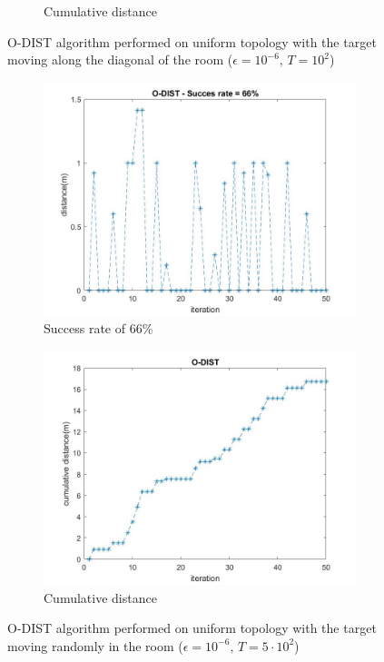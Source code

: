 \begin{figure}[H]
\begin{subfigure}{0.45\textwidth}
        \caption{Cumulative distance}
    \end{subfigure}
    \caption{O-DIST algorithm performed on uniform topology with the target moving along the diagonal of the room ($\epsilon=10^{-6},\,T=10^2$)}
    \label{fig: target moving along the diagonal}
\end{figure}

\begin{figure}[H]
    \begin{subfigure}{0.45\textwidth}
        \centering
        \includegraphics[width=\textwidth]{img/O-DIST_casual_distance_1e2.jpg}
        \caption{Success rate of 66\%}
    \end{subfigure}
    \hfill
    \begin{subfigure}{0.45\textwidth}
        \centering
        \includegraphics[width=\textwidth]{img/O-DIST_casual_cumdist_1e2.jpg}
        \caption{Cumulative distance}
    \end{subfigure}
    \caption{O-DIST algorithm performed on uniform topology with the target moving randomly in the room ($\epsilon=10^{-6},\,T=5\cdot10^2$)}
    \label{fig: target moving randomly 1e2}
\end{figure}

